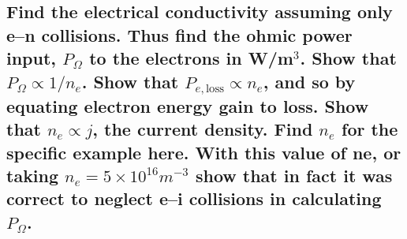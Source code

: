 \documentclass[answers]{exam}
\begin{document}
\begin{questions}
\begin{parts}

\part{Find the electrical conductivity assuming only e–n collisions. Thus find the ohmic power input, $P_\Omega$ to the electrons in W/m$^3$. Show that $P_\Omega \propto 1/n_e$. Show that $P_{e,\text{loss}} \propto n_e$, and so by equating electron energy gain to loss. Show that $n_e \propto j$, the current density. Find $n_e$ for the specific example here. With this value of ne, or taking $n_e = 5 \times 10^{16} \unit{m^{-3}}$ show that in fact it was correct to neglect e–i collisions in calculating $P_\Omega$.}


\end{parts}
\end{questions}
\end{document}
